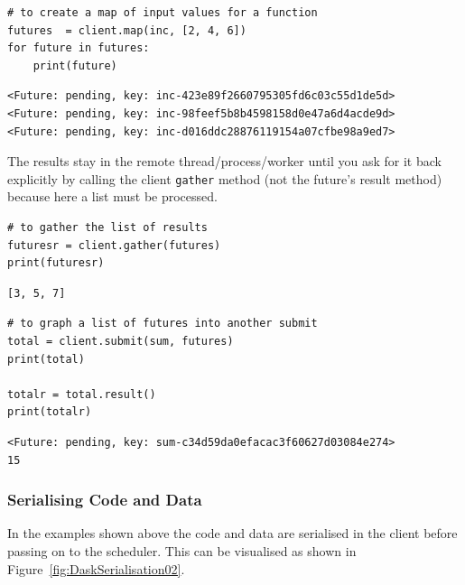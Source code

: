 \begin{lstlisting}[style=incellstyle]
# to create a map of input values for a function
futures  = client.map(inc, [2, 4, 6])
for future in futures:
    print(future)
\end{lstlisting}


\begin{lstlisting}[style=outcellstyle]
<Future: pending, key: inc-423e89f2660795305fd6c03c55d1de5d>
<Future: pending, key: inc-98feef5b8b4598158d0e47a6d4acde9d>
<Future: pending, key: inc-d016ddc28876119154a07cfbe98a9ed7>

\end{lstlisting}

The results stay in the remote thread/process/worker until you ask for it back explicitly by calling the client \verb+gather+ method (not the future's result method) because here a list must be processed.



\begin{lstlisting}[style=incellstyle]
# to gather the list of results
futuresr = client.gather(futures)
print(futuresr)
\end{lstlisting}


\begin{lstlisting}[style=outcellstyle]
[3, 5, 7]

\end{lstlisting}


\begin{lstlisting}[style=incellstyle]
# to graph a list of futures into another submit
total = client.submit(sum, futures)
print(total)
 
totalr = total.result()
print(totalr)
\end{lstlisting}


\begin{lstlisting}[style=outcellstyle]
<Future: pending, key: sum-c34d59da0efacac3f60627d03084e274>
15

\end{lstlisting}

\subsubsection{Serialising Code and Data}
\label{sec:SerialisingCodeandData}

In the examples shown above the code and data are serialised in the client before passing on to the scheduler. This can be visualised as shown in Figure~\ref{fig:DaskSerialisation02}.


